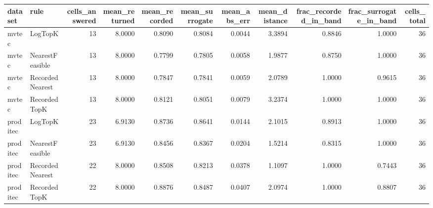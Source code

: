 \begin{tabular}{llrrrrrrrrr}
\toprule
 dataset &            rule &  cells\_answered &  mean\_returned &  mean\_recorded &  mean\_surrogate &  mean\_abs\_err &  mean\_distance &  frac\_recorded\_in\_band &  frac\_surrogate\_in\_band &  cells\_total \\
\midrule
   mvtec &         LogTopK &              13 &         8.0000 &         0.8090 &          0.8084 &        0.0044 &         3.3894 &                 0.8846 &                  1.0000 &           36 \\
   mvtec & NearestFeasible &              13 &         8.0000 &         0.7799 &          0.7805 &        0.0058 &         1.9877 &                 0.8750 &                  1.0000 &           36 \\
   mvtec & RecordedNearest &              13 &         8.0000 &         0.7847 &          0.7841 &        0.0059 &         2.0789 &                 1.0000 &                  0.9615 &           36 \\
   mvtec &    RecordedTopK &              13 &         8.0000 &         0.8121 &          0.8051 &        0.0079 &         3.2374 &                 1.0000 &                  1.0000 &           36 \\
proditec &         LogTopK &              23 &         6.9130 &         0.8736 &          0.8641 &        0.0144 &         2.1015 &                 0.8913 &                  1.0000 &           36 \\
proditec & NearestFeasible &              23 &         6.9130 &         0.8456 &          0.8367 &        0.0204 &         1.5214 &                 0.8315 &                  1.0000 &           36 \\
proditec & RecordedNearest &              22 &         8.0000 &         0.8508 &          0.8213 &        0.0378 &         1.1097 &                 1.0000 &                  0.7443 &           36 \\
proditec &    RecordedTopK &              22 &         8.0000 &         0.8876 &          0.8487 &        0.0407 &         2.0974 &                 1.0000 &                  0.8807 &           36 \\
\bottomrule
\end{tabular}
